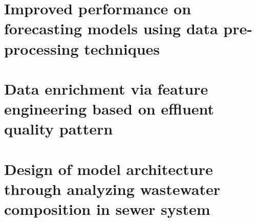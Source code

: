 \section{Improved performance on forecasting models using data pre-processing techniques}
\section{Data enrichment via feature engineering based on effluent quality pattern}
\section{Design of model architecture through analyzing wastewater composition in sewer system}
